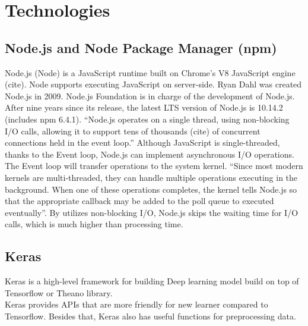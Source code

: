 

\section{Technologies}
\subsection{Node.js and Node Package Manager (npm)}
Node.js (Node) is a JavaScript runtime built on Chrome's V8 JavaScript engine (cite). Node supports executing JavaScript on server-side. Ryan Dahl was created Node.js in 2009. Node.js Foundation is in charge of the development of Node.js. After nine years since its release, the latest LTS version of Node.js is 10.14.2 (includes npm 6.4.1). “Node.js operates on a single thread, using non-blocking I/O calls, allowing it to support tens of thousands (cite) of concurrent connections held in the event loop.” Although JavaScript is single-threaded, thanks to the Event loop, Node.js can implement asynchronous I/O operations. The Event loop will transfer operations to the system kernel. “Since most modern kernels are multi-threaded, they can handle multiple operations executing in the background. When one of these operations completes, the kernel tells Node.js so that the appropriate callback may be added to the poll queue to executed eventually”. By utilizes non-blocking I/O, Node.js skips the waiting time for I/O calls, which is much higher than processing time.
\subsection{Keras}
Keras is a high-level framework for building Deep learning model build on top of Tensorflow or Theano library.\\
Keras provides APIs that are more friendly for new learner compared to Tensorflow. Besides that, Keras also has useful functions for preprocessing data.
